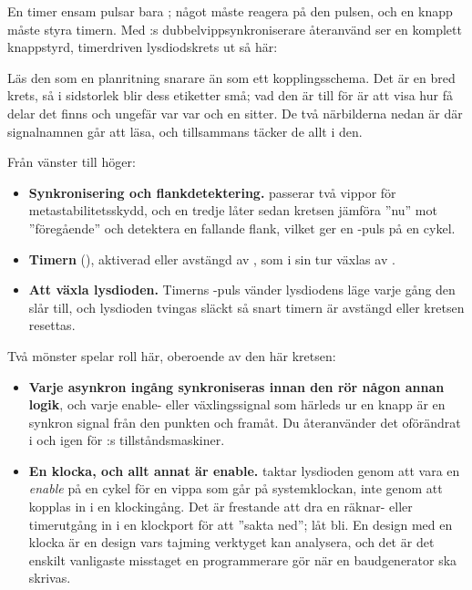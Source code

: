En timer ensam pulsar bara ; något måste reagera på den pulsen, och en knapp måste
styra timern. Med :s dubbelvippsynkroniserare återanvänd ser en komplett knappstyrd,
timerdriven lysdiodskrets ut så här:


Läs den som en planritning snarare än som ett kopplingsschema. Det är en bred krets, så i
sidstorlek blir dess etiketter små; vad den är till för är att visa hur få delar det finns och
ungefär var var och en sitter. De två närbilderna nedan är där signalnamnen går att läsa, och
tillsammans täcker de allt i den.

Från vänster till höger:
\begin{itemize}
  \item \textbf{Synkronisering och flankdetektering.}  passerar två vippor för
    metastabilitetsskydd, och en tredje låter sedan kretsen jämföra ”nu” mot ”föregående” och
    detektera en fallande flank, vilket ger en -puls på en cykel.
  \item \textbf{Timern} (), aktiverad eller avstängd av
    , som i sin tur växlas av .
  \item \textbf{Att växla lysdioden.} Timerns -puls vänder lysdiodens läge varje gång
    den slår till, och lysdioden tvingas släckt så snart timern är avstängd eller kretsen resettas.
\end{itemize}



Två mönster spelar roll här, oberoende av den här kretsen:
\begin{itemize}
  \item \textbf{Varje asynkron ingång synkroniseras innan den rör någon annan logik}, och varje
    enable- eller växlingssignal som härleds ur en knapp är en synkron signal från den punkten och
    framåt. Du återanvänder det oförändrat i  och igen för :s
    tillståndsmaskiner.
  \item \textbf{En klocka, och allt annat är enable.}  taktar lysdioden genom att
    vara en \emph{enable} på en cykel för en vippa som går på systemklockan, inte genom att kopplas
    in i en klockingång. Det är frestande att dra en räknar- eller timerutgång in i en klockport för
    att ”sakta ned”; låt bli. En design med en klocka är en design vars tajming verktyget kan
    analysera, och det är det enskilt vanligaste misstaget en programmerare gör när en
    baudgenerator ska skrivas.
\end{itemize}

